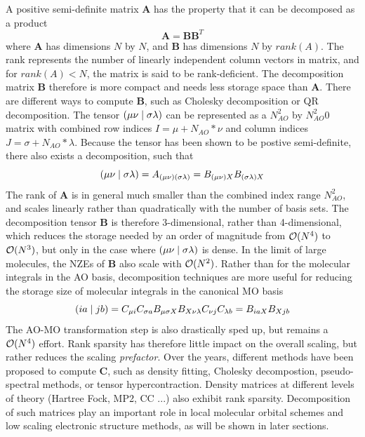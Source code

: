 A positive semi-definite matrix $\mathbf{A}$ has the property that it can be decomposed as a product 
\begin{equation}
\mathbf{A} = \mathbf{B} \mathbf{B}^T
\end{equation}
\noindent where $\mathbf{A}$ has dimensions $N$ by $N$, and $\mathbf{B}$ has dimensions $N$ by $rank(A)$. The rank represents the number of linearly independent column vectors in matrix, and for $rank(A) < N$, the matrix is said to  be rank-deficient. The decomposition matrix $\mathbf{B}$ therefore is more compact and needs less storage space than $\mathbf{A}$. There are different ways to compute $\mathbf{B}$, such as Cholesky decomposition or QR decomposition.
The tensor $\left( \mu\nu \mid \sigma\lambda \right)$ can be represented as a $N_{AO}^2$
by $N_{AO}^2$0 matrix with combined row indices $I = \mu + N_{AO}*\nu$ and column indices $J = \sigma + N_{AO}*\lambda$. Because the tensor has been shown to be postive semi-definite, there also exists a decomposition, such that
\begin{equation}
\left( \mu\nu \mid \sigma\lambda \right) = A_{(\mu\nu)(\sigma\lambda)} = B_{(\mu\nu)X} B_{(\sigma\lambda)X}
\end{equation}
\noindent The rank of $\mathbf{A}$ is in general much smaller than the combined index range $N_{AO}^2$, and scales linearly rather than quadratically with the number of basis sets. The decomposition tensor $\mathbf{B}$ is therefore 3-dimensional, rather than 4-dimensional, which reduces the storage needed by an order of magnitude from $\mathcal{O}(N^{4})$ to $\mathcal{O}(N^{3})$, but only in the case where $\left( \mu\nu \mid \sigma\lambda \right)$ is dense. In the limit of large molecules, the NZEs of $\mathbf{B}$ also scale with $\mathcal{O}(N^{2})$. Rather than for the molecular integrals in the AO basis, decomposition techniques are more useful for reducing the storage size of molecular integrals in the canonical MO basis
\begin{equation}
\left( ia \mid jb \right) = C_{\mu i} C_{\sigma a} B_{\mu \sigma X} B_{X \nu \lambda} C_{\nu j} C_{\lambda b} = B_{iaX} B_{Xjb}
\end{equation} 
\noindent The AO-MO transformation step is also drastically sped up, but remains a $\mathcal{O}(N^{4})$ effort. Rank sparsity has therefore little impact on the overall scaling, but rather reduces the scaling \emph{prefactor}. Over the years, different methods have been proposed to compute $\mathbf{C}$, such as density fitting, Cholesky decompostion, pseudo-spectral methods, or tensor hypercontraction.
Density matrices at different levels of theory (Hartree Fock, MP2, CC ...) also exhibit rank sparsity. Decomposition of such matrices play an important role in local molecular orbital schemes and low scaling electronic structure methods, as will be shown in later sections.

